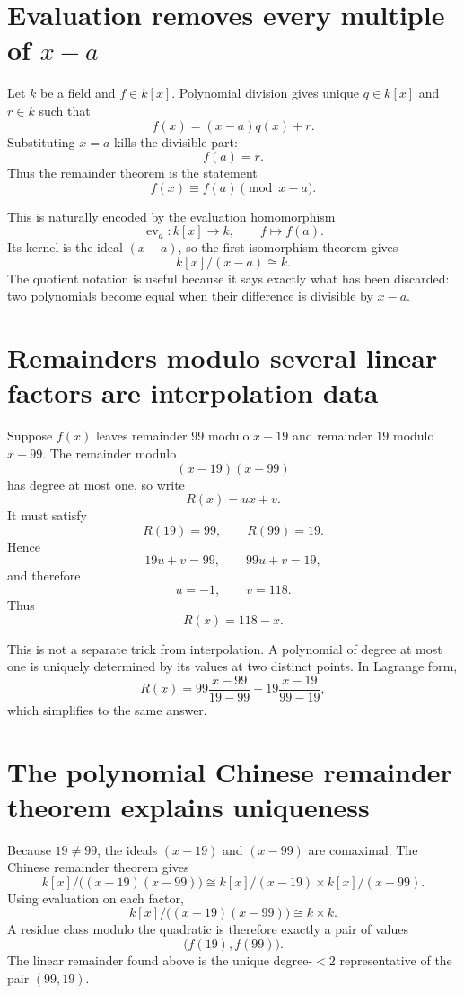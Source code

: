 \section{Evaluation removes every multiple of \texorpdfstring{$x-a$}{x-a}}

Let \(k\) be a field and \(f\in k[x]\).  Polynomial division gives unique \(q\in k[x]\) and \(r\in k\) such that
\[
  f(x)=(x-a)q(x)+r.
\]
Substituting \(x=a\) kills the divisible part:
\[
  f(a)=r.
\]
Thus the remainder theorem is the statement
\[
  f(x)\equiv f(a)\pmod{x-a}.
\]

This is naturally encoded by the evaluation homomorphism
\[
  \operatorname{ev}_a:k[x]\longrightarrow k,
  \qquad
  f\longmapsto f(a).
\]
Its kernel is the ideal \((x-a)\), so the first isomorphism theorem gives
\[
  k[x]/(x-a)\cong k.
\]
The quotient notation is useful because it says exactly what has been discarded: two polynomials become equal when their difference is divisible by \(x-a\).

\section{Remainders modulo several linear factors are interpolation data}

Suppose \(f(x)\) leaves remainder \(99\) modulo \(x-19\) and remainder \(19\) modulo \(x-99\).  The remainder modulo
\[
  (x-19)(x-99)
\]
has degree at most one, so write
\[
  R(x)=ux+v.
\]
It must satisfy
\[
  R(19)=99,
  \qquad
  R(99)=19.
\]
Hence
\[
  19u+v=99,
  \qquad
  99u+v=19,
\]
and therefore
\[
  u=-1,
  \qquad
  v=118.
\]
Thus
\[
  \boxed{R(x)=118-x.}
\]

This is not a separate trick from interpolation.  A polynomial of degree at most one is uniquely determined by its values at two distinct points.  In Lagrange form,
\[
  R(x)
  =99\frac{x-99}{19-99}
   +19\frac{x-19}{99-19},
\]
which simplifies to the same answer.

\section{The polynomial Chinese remainder theorem explains uniqueness}

Because \(19\ne99\), the ideals \((x-19)\) and \((x-99)\) are comaximal.  The Chinese remainder theorem gives
\[
  k[x]/\bigl((x-19)(x-99)\bigr)
  \cong
  k[x]/(x-19)\times k[x]/(x-99).
\]
Using evaluation on each factor,
\[
  k[x]/\bigl((x-19)(x-99)\bigr)
  \cong k\times k.
\]
A residue class modulo the quadratic is therefore exactly a pair of values
\[
  \bigl(f(19),f(99)\bigr).
\]
The linear remainder found above is the unique degree-\(<2\) representative of the pair \((99,19)\).

